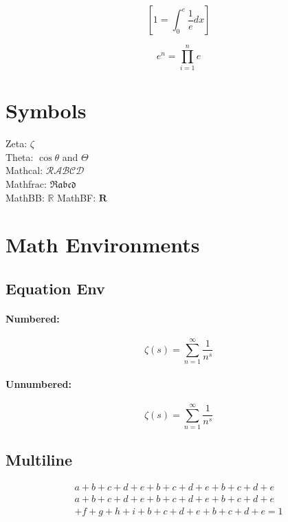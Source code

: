 \documentclass[a4paper,12pt]{article}
\begin{document}
\begin{equation}
   \left[  1 = \int_0^e\frac{1}{e}dx \right]
\end{equation}

\begin{equation}
    e^n = \prod_{i=1}^{n}e
\end{equation}

\section{Symbols}

Zeta: $\zeta$ \\
Theta: $\cos\theta$ and $\Theta$ \\
Mathcal: $\mathcal{RABCD}$ \\
Mathfrac: $\mathfrak{Rabcd}$ \\
MathBB: $\mathbb{R}$
MathBF: $\mathbf{R}$


\section{Math Environments}

\subsection{Equation Env}
\paragraph{Numbered:}
\begin{equation}
    \zeta(s)=\sum_{n=1}^{\infty}\frac{1}{n^s}
\end{equation}
\paragraph{Unnumbered:}
\begin{equation*}
    \zeta(s)=\sum_{n=1}^{\infty}\frac{1}{n^s}
\end{equation*}

\subsection{Multiline}
\begin{multline}
    a + b + c + d + e + b + c + d + e + b + c + d + e\\ 
    a + b + c + d + e + b + c + d + e + b + c + d + e\\ 
    + f + g + h + i + b + c + d + e + b + c + d + e = 1
\end{multline}
\end{document}
